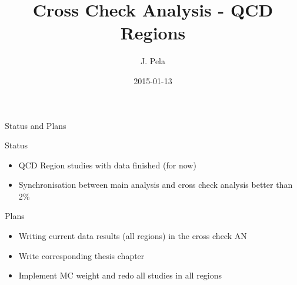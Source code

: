 \documentclass[8pt]{beamer}
\author[J. Pela]{J. Pela}
\title{Cross Check Analysis - QCD Regions}
\institute[ICL]{Imperial College London}
\date{2015-01-13}
\begin{document}
\begin{frame}
  \titlepage
\end{frame}

\begin{frame}{Status and Plans}

\begin{block}{Status}

\begin{itemize}
  \item QCD Region studies with data finished (for now)
  \item Synchronisation between main analysis and cross check analysis better than 2\% 
\end{itemize}

\end{block}

\begin{block}{Plans}

\begin{itemize}
  \item Writing current data results (all regions) in the cross check AN
  \item Write corresponding thesis chapter
  \item Implement MC weight and redo all studies in all regions
\end{itemize}
 
\end{block}

\end{frame}
\end{document}
